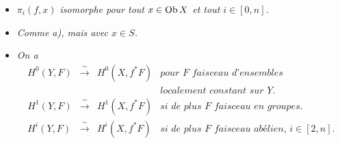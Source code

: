 \begin{itemize}
\item[\textit{a)}] \textit{$\pi_i(f,x)$ isomorphe pour tout $x \in \mathrm{Ob}\, X$ et tout $i \in [0,n]$.}

\item[\textit{a$'$)}] \textit{Comme a), mais avec $x \in S$.}

\item[\textit{b)}] \textit{On a}
\[
\begin{array}{rcll}
H^0(Y,F) & \xrightarrow{\ \sim\ } & H^0(X,f^*F) & \textit{pour $F$ faisceau d'ensembles}\\
 & & & \textit{localement constant sur $Y$.}\\
H^1(Y,F) & \xrightarrow{\ \sim\ } & H^1(X,f^*F) & \textit{si de plus $F$ faisceau en groupes.}\\
H^i(Y,F) & \xrightarrow{\ \sim\ } & H^i(X,f^*F) & \textit{si de plus $F$ faisceau abélien, $i \in [2,n]$.}
\end{array}
\]
\end{itemize}


